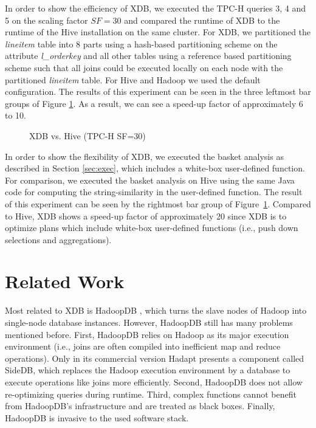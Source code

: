 \documentclass{sig-alternate}
\begin{document}
In order to show the efficiency of XDB, we executed the TPC-H queries 3, 4 and 5 on the scaling factor $SF=30$ and compared the runtime of XDB to the runtime of the Hive installation on the same cluster. For XDB, we partitioned the \emph{lineitem} table into 8 parts using a hash-based partitioning scheme on the attribute \emph{l\_orderkey} and all other tables using a reference based partitioning scheme such that all joins could be executed locally on each node with the partitioned \emph{lineitem} table. For Hive and Hadoop we used the default configuration. The results of this experiment can be seen in the three leftmost bar groups of Figure \ref{fig:perf}. As a result, we can see a speed-up factor of approximately 6 to 10.
 
\begin{figure}[ht] 
\vspace{-2ex}
\vspace{-3ex}
\caption{XDB vs. Hive (TPC-H SF=30)}
\vspace{-1ex}
\label{fig:perf}
\end{figure}

In order to show the flexibility of XDB, we executed the basket analysis as described in Section \ref{sec:exec}, which includes a white-box user-defined function. For comparison, we executed the basket analysis on Hive using the same Java code for computing the string-similarity in the user-defined function. The result of this experiment can be seen by the rightmost bar group of Figure~\ref{fig:perf}. Compared to Hive, XDB shows a speed-up factor of approximately 20 since XDB is to optimize plans which include white-box user-defined functions (i.e., push down selections and aggregations). 

\section{Related Work}
\label{sec:rel}

Most related to XDB is HadoopDB \cite{HadoopDB:SIGMOD:2010}, which turns the slave nodes of Hadoop into single-node database instances. However, HadoopDB still has many problems mentioned before. First, HadoopDB relies on Hadoop as its major execution environment (i.e., joins are often compiled into inefficient map and reduce operations). Only in its commercial version Hadapt \cite{Hadapt:SIGMOD:2011} presents a component called SideDB, which replaces the Hadoop execution environment by a database to execute operations like joins more efficiently. Second, HadoopDB does not allow re-optimizing queries during runtime. Third, complex functions cannot benefit from HadoopDB's infrastructure and are treated as black boxes. Finally, HadoopDB is invasive to the used software stack. 
\end{document}
